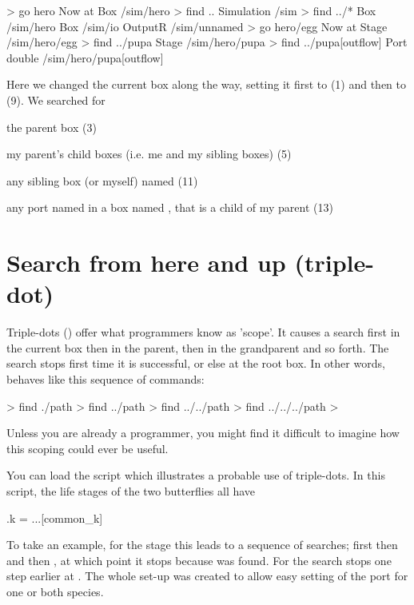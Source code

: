 \lstset{numbers=left}
\begin{usdialog}
> go hero
Now at Box /sim/hero
> find ..
Simulation /sim
> find ../*
Box     /sim/hero
Box     /sim/io
OutputR /sim/unnamed
> go hero/egg
Now at Stage /sim/hero/egg
> find ../pupa
Stage /sim/hero/pupa
> find ../pupa[outflow]
Port double /sim/hero/pupa[outflow]
\end{usdialog}
\lstset{numbers=none}
\noindent

Here we changed the current box along the way, setting it first to  (1) and then to  (9). We searched for 
\begin{compactitem}
\item the parent box (3)
\item my parent's child boxes (i.e. me and my sibling boxes) (5)
\item any sibling box (or myself) named  (11)
\item any port named  in a box named , that is a child of my parent (13)
\end{compactitem}

\section{Search from here and up (triple-dot)}
Triple-dots () offer what programmers know as 'scope'. It causes a search first in the current box then in the parent, then in the grandparent and so forth. The search stops first time it is successful, or else at the root box. In other words,  behaves like this sequence of commands:

\begin{uscmd}
> find ./path
> find ../path
> find ../../path
> find ../../../path
> %
\end{uscmd}

Unless you are already a programmer, you might find it difficult to imagine how this scoping could ever be useful.

You can load the  script which illustrates a probable use of triple-dots. In this script, the life stages of the two butterflies all have

\begin{boxscript}
.k = ...[common_k]
\end{boxscript}

To take an example, for the  stage this leads to a sequence of searches; first  then  and then , at which point it stops because  was found. For  the search stops one step earlier at . The whole set-up was created to allow easy setting of the  port for one or both species.

